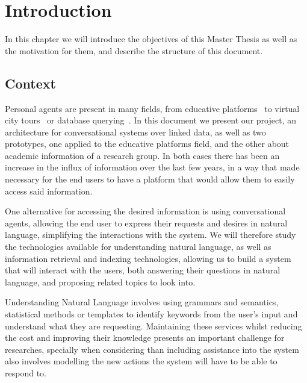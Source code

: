 \chapter{Introduction}
\label{chapter:intro}

\begin{chapterintro}

In this chapter we will introduce the objectives of this Master Thesis as well as the motivation for them, and describe the structure of this document.
 
\end{chapterintro}

\cleardoublepage

\section{Context}

Personal agents are present in many fields, from educative platforms~\cite{fonte2012intelligent} to virtual city tours~\cite{bogdanovych2012the} or database querying~\cite{augello2009semantic}. In this document we present our project, an architecture for conversational systems over linked data, as well as two prototypes, one applied to the educative platforms field, and the other about academic information of a research group. In both cases there has been an increase in the influx of information over the last few years, in a way that made necessary for the end users to have a platform that would allow them to easily access said information.

One alternative for accessing the desired information is using conversational agents, allowing the end user to express their requests and desires in natural language, simplifying the interactions with the system. We will therefore study the technologies available for understanding natural language, as well as information retrieval and indexing technologies, allowing us to build a system that will interact with the users, both answering their questions in natural language, and proposing related topics to look into.

Understanding Natural Language involves using grammars and semantics, statistical methods or templates to identify keywords from the user's input and understand what they are requesting. Maintaining these services whilst reducing the cost and improving their knowledge presents an important challenge for researches, specially when considering than including assistance into the system also involves modelling the new actions the system will have to be able to respond to.


